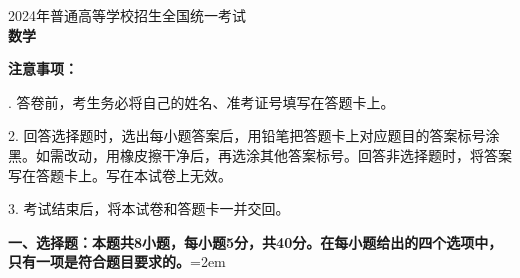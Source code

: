 \documentclass[UTF8,a4paper]{ctexart}
\begin{document}


\fontsize{11}{13.2}\selectfont



\begin{center}
{\fontsize{17pt}{20.4pt}\selectfont 2024年普通高等学校招生全国统一考试\\[9pt]
\textbf{\fontsize{22pt}{26.4pt}\selectfont 数学}}
\end{center}

\vspace{1em}

\noindent\textbf{注意事项：}\par{}. 答卷前，考生务必将自己的姓名、准考证号填写在答题卡上。\par
2. 回答选择题时，选出每小题答案后，用铅笔把答题卡上对应题目的答案标号涂黑。如需改动，用橡皮擦干净后，再选涂其他答案标号。回答非选择题时，将答案写在答题卡上。写在本试卷上无效。\par
3. 考试结束后，将本试卷和答题卡一并交回。

\par\vspace{6pt}



\noindent\textbf{一、选择题：本题共8小题，每小题5分，共40分。在每小题给出的四个选项中，只有一项是符合题目要求的。}\hangindent=2em
\par\medskip
\end{document}
